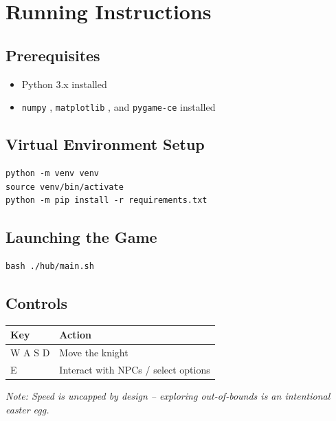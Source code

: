\documentclass[12pt, a4paper]{article}
\begin{document}
\section{Running Instructions}

\subsection{Prerequisites}

\begin{itemize}
    \item Python 3.x installed
    \item \texttt{numpy} \cite{numpy}, \texttt{matplotlib} \cite{matplotlib}, and \texttt{pygame-ce} \cite{pygamece} installed
\end{itemize}

\subsection{Virtual Environment Setup}

\begin{verbatim}
python -m venv venv
source venv/bin/activate
python -m pip install -r requirements.txt
\end{verbatim}

\subsection{Launching the Game}

\begin{verbatim}
bash ./hub/main.sh
\end{verbatim}

\subsection{Controls}

\begin{center}
\begin{tabular}{| >{\ttfamily}l | p{8cm} |}
\hline
\normalfont\textbf{Key} & \textbf{Action} \\
\hline
W A S D & Move the knight \\
E       & Interact with NPCs / select options \\
\hline
\end{tabular}
\end{center}

\textit{Note: Speed is uncapped by design -- exploring out-of-bounds is an intentional easter egg.}
\end{document}
